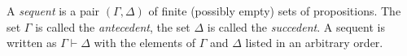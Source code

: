 

\setcounter{section}{2}
\setcounter{subsection}{4}
\setcounter{dfn}{5}

\begin{dfn}
A \emph{sequent} is a pair $(\Gamma, \Delta)$ of finite (possibly empty) sets of propositions.
The set $\Gamma$ is called the \emph{antecedent}, the set $\Delta$ is called the \emph{succedent}.
A sequent is written as $\Gamma \vdash \Delta$ with the elements of $\Gamma$ and $\Delta$ listed in an arbitrary order.
\end{dfn}


